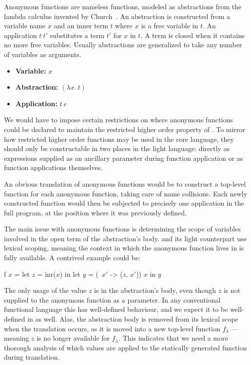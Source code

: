 Anonymous functions are nameless functions, modeled as abstractions from the
lambda calculus invented by Church~\cite{Church:1936}. An abstraction is
constructed from a variable name $x$ and an inner term $t$ where $x$ is a free
variable in $t$. An application $t~t'$ substitutes a term $t'$ for $x$ in $t$.
A term is closed when it contains no more free variables. Usually abstractions
are generalized to take any number of variables as arguments.

\begin{itemize}

  \item \textbf{Variable:} $x$

  \item \textbf{Abstraction:} $(\lambda x .~t)$

  \item \textbf{Application:} $t~c$

\end{itemize}

We would have to impose certain restrictions on where anonymous functions could
be declared to maintain the restricted higher order property of \rfunc. To
mirror how restricted higher order functions may be used in the core language,
they should only be constructable in two places in the light language: directly
as expressions supplied as an ancillary parameter during function application or
as function applications themselves.

An obvious translation of anonymous functions would be to construct a top-level
function for each anonymous function, taking care of name collisions. Each
newly constructed function would then be subjected to precisely one application
in the full program, at the position where it was previously defined.

The main issue with anonymous functions is determining the scope of variables
involved in the open term of the abstraction's body. \rfunc and its light
counterpart use lexical scoping, meaning the context in which the anonymous
function lives in is fully available. A contrived example could be:

\begin{rfuncode}
f $x$ = let $z$ = inr($x$)
   in let $y$ = (\ $x'$ -> ($z$, $x'$)) $x$
   in $y$
\end{rfuncode}

The only usage of the value $z$ is in the abstraction's body, even though $z$
is not supplied to the anonymous function as a parameter. In any conventional
functional language this has well-defined behaviour, and we expect it to be
well-defined in \rfunc as well. Alas, the abstraction body is removed from its
lexical scope when the translation occurs, as it is moved into a new top-level
function $f_\lambda$ --- meaning $z$ is no longer available for $f_\lambda$.
This indicates that we need a more thorough analysis of which values are
applied to the statically generated function during translation.

